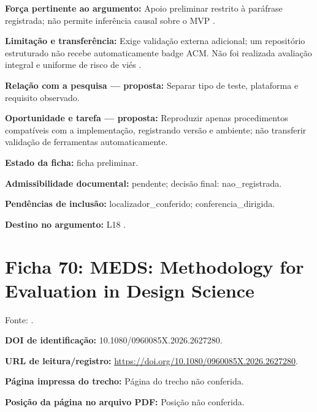 \noindent\textbf{Força pertinente ao argumento:} Apoio preliminar restrito à paráfrase registrada; não permite inferência causal sobre o MVP \citep{eng18}.\par\medskip

\noindent\textbf{Limitação e transferência:} Exige validação externa adicional; um repositório estruturado não recebe automaticamente badge ACM. Não foi realizada avaliação integral e uniforme de risco de viés \citep{eng18}.\par\medskip

\noindent\textbf{Relação com a pesquisa — proposta:} Separar tipo de teste, plataforma e requisito observado.\par\medskip

\noindent\textbf{Oportunidade e tarefa — proposta:} Reproduzir apenas procedimentos compatíveis com a implementação, registrando versão e ambiente; não transferir validação de ferramentas automaticamente.\par\medskip

\noindent\textbf{Estado da ficha:} ficha preliminar.\par\medskip

\noindent\textbf{Admissibilidade documental:} pendente; decisão final: nao\_registrada.\par\medskip

\noindent\textbf{Pendências de inclusão:} localizador\_conferido; conferencia\_dirigida.\par\medskip

\noindent\textbf{Destino no argumento:} L18 .

\clearpage\section*{Ficha 70: MEDS: Methodology for Evaluation in Design Science}

Fonte: \citet{eng20}.

\noindent\textbf{DOI de identificação:} 10.1080/0960085X.2026.2627280.\par\medskip

\noindent\textbf{URL de leitura/registro:} \url{https://doi.org/10.1080/0960085X.2026.2627280}.\par\medskip

\noindent\textbf{Página impressa do trecho:} Página do trecho não conferida.\par\medskip

\noindent\textbf{Posição da página no arquivo PDF:} Posição não conferida.\par\medskip

